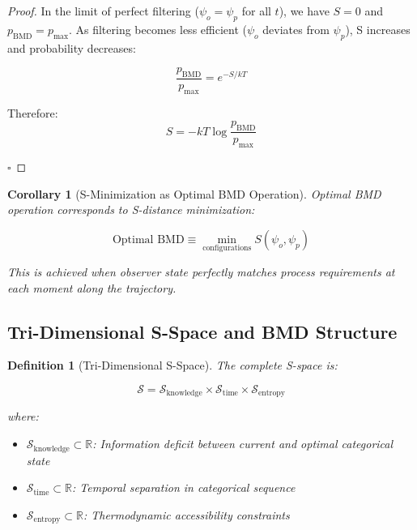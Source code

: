 \documentclass[12pt,a4paper]{article}
\newtheorem{corollary}[theorem]{Corollary}
\newtheorem{definition}[theorem]{Definition}
\begin{document}
\begin{proof}
In the limit of perfect filtering ($\psi_o = \psi_p$ for all $t$), we have $S = 0$ and $p_{\text{BMD}} = p_{\text{max}}$. As filtering becomes less efficient ($\psi_o$ deviates from $\psi_p$), S increases and probability decreases:

\begin{equation}
\frac{p_{\text{BMD}}}{p_{\text{max}}} = e^{-S/kT}
\end{equation}

Therefore:
\begin{equation}
S = -kT \log \frac{p_{\text{BMD}}}{p_{\text{max}}}
\end{equation}

$\square$
\end{proof}

\begin{corollary}[S-Minimization as Optimal BMD Operation]
\label{cor:s_minimization}
Optimal BMD operation corresponds to S-distance minimization:

\begin{equation}
\text{Optimal BMD} \equiv \min_{\text{configurations}} S(\psi_o, \psi_p)
\end{equation}

This is achieved when observer state perfectly matches process requirements at each moment along the trajectory.
\end{corollary}

\subsection{Tri-Dimensional S-Space and BMD Structure}

\begin{definition}[Tri-Dimensional S-Space]
\label{def:s_space}
The complete S-space is:

\begin{equation}
\mathcal{S} = \mathcal{S}_{\text{knowledge}} \times \mathcal{S}_{\text{time}} \times \mathcal{S}_{\text{entropy}}
\end{equation}

where:
\begin{itemize}
\item $\mathcal{S}_{\text{knowledge}} \subset \mathbb{R}$: Information deficit between current and optimal categorical state
\item $\mathcal{S}_{\text{time}} \subset \mathbb{R}$: Temporal separation in categorical sequence
\item $\mathcal{S}_{\text{entropy}} \subset \mathbb{R}$: Thermodynamic accessibility constraints
\end{itemize}
\end{definition}
\end{document}
